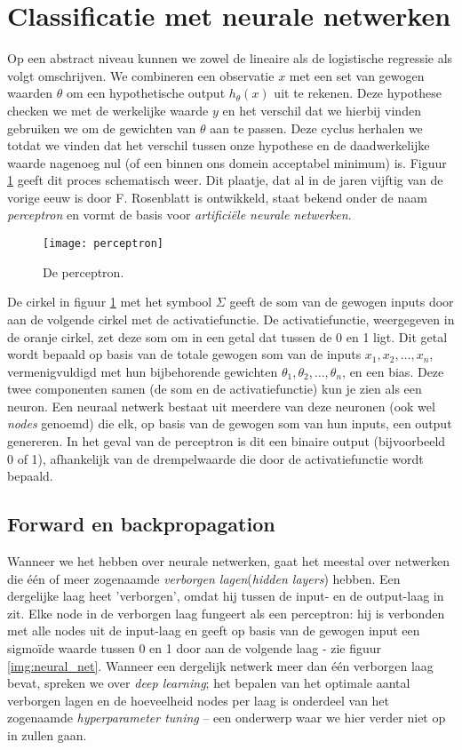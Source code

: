 
\section{Classificatie met neurale netwerken}

Op een abstract niveau kunnen we zowel de lineaire als de logistische regressie als volgt omschrijven. We combineren een observatie $x$ met een set van gewogen waarden $\theta$ om een hypothetische output $h_\theta(x)$ uit te rekenen. Deze hypothese checken we met de werkelijke waarde $y$ en het verschil dat we hierbij vinden gebruiken we om de gewichten van $\theta$ aan te passen. Deze cyclus herhalen we totdat we vinden dat het verschil tussen onze hypothese en de daadwerkelijke waarde nagenoeg nul (of een binnen ons domein acceptabel minimum) is. Figuur \ref{img:perceptron} geeft dit proces schematisch weer. Dit plaatje, dat al in de jaren vijftig van de vorige eeuw is door F. Rosenblatt is ontwikkeld, staat bekend onder de naam \textit{perceptron} en vormt de basis voor \textit{artificiële neurale netwerken}. 


\begin{figure}[h]
\centering
\texttt{[image: perceptron]}
\caption{De perceptron.\label{img:perceptron}}
\end{figure}

De cirkel in figuur \ref{img:perceptron} met het symbool $\Sigma$ geeft de som van de gewogen inputs door aan de volgende cirkel met de activatiefunctie. De activatiefunctie, weergegeven in de oranje cirkel, zet deze som om in een getal dat tussen de 0 en 1 ligt. Dit getal wordt bepaald op basis van de totale gewogen som van de inputs $x_1, x_2, \dots, x_n$, vermenigvuldigd met hun bijbehorende gewichten $\theta_1, \theta_2, \dots, \theta_n$, en een bias. Deze twee componenten samen (de som en de activatiefunctie) kun je zien als een neuron. Een neuraal netwerk bestaat uit meerdere van deze neuronen (ook wel \textit{nodes} genoemd) die elk, op basis van de gewogen som van hun inputs, een output genereren. In het geval van de perceptron is dit een binaire output (bijvoorbeeld 0 of 1), afhankelijk van de drempelwaarde die door de activatiefunctie wordt bepaald.

\subsection{Forward en backpropagation}

Wanneer we het hebben over neurale netwerken, gaat het meestal over netwerken die één of meer zogenaamde \textit{verborgen lagen}(\textit{hidden layers}) hebben. Een dergelijke laag heet 'verborgen', omdat hij tussen de input- en de output-laag in zit. Elke node in de verborgen laag fungeert als een perceptron: hij is verbonden met alle nodes uit de input-laag en geeft op basis van de gewogen input een sigmoïde waarde tussen 0 en 1 door aan de volgende laag - zie figuur \ref{img:neural_net}. Wanneer een dergelijk netwerk meer dan één verborgen laag bevat, spreken we over \textit{deep learning}; het bepalen van het optimale aantal verborgen lagen en de hoeveelheid nodes per laag is onderdeel van het zogenaamde \textit{hyperparameter tuning} – een onderwerp waar we hier verder niet op in zullen gaan.

